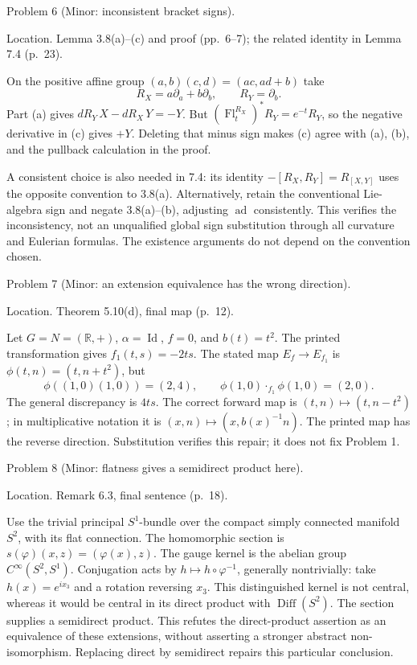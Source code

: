 \documentclass[10pt]{article}
\begin{document}
Problem 6 (Minor: inconsistent bracket signs).\par
Location. Lemma 3.8(a)–(c) and proof (pp. 6–7); the related identity in Lemma 7.4 (p. 23).\par
On the positive affine group \((a,b)(c,d)=(ac,ad+b)\) take \[R_X=a\partial_a+b\partial_b,\qquad R_Y=\partial_b.\] Part (a) gives \(dR_Y\,X-dR_X\,Y=-Y\). But \((\operatorname{Fl}_t^{R_X})^*R_Y=e^{-t}R_Y\), so the negative derivative in (c) gives \(+Y\). Deleting that minus sign makes (c) agree with (a), (b), and the pullback calculation in the proof.\par
A consistent choice is also needed in 7.4: its identity \(-[R_X,R_Y]=R_{[X,Y]}\) uses the opposite convention to 3.8(a). Alternatively, retain the conventional Lie-algebra sign and negate 3.8(a)–(b), adjusting \(\operatorname{ad}\) consistently. This verifies the inconsistency, not an unqualified global sign substitution through all curvature and Eulerian formulas. The existence arguments do not depend on the convention chosen.\par
Problem 7 (Minor: an extension equivalence has the wrong direction).\par
Location. Theorem 5.10(d), final map (p. 12).\par
Let \(G=N=(\mathbb R,+)\), \(\alpha=\operatorname{Id}\), \(f=0\), and \(b(t)=t^2\). The printed transformation gives \(f_1(t,s)=-2ts\). The stated map \(E_f\to E_{f_1}\) is \(\phi(t,n)=(t,n+t^2)\), but \[\phi((1,0)(1,0))=(2,4),\qquad
 \phi(1,0)\mathbin{\cdot_{f_1}}\phi(1,0)=(2,0).\] The general discrepancy is \(4ts\). The correct forward map is \((t,n)\mapsto(t,n-t^2)\); in multiplicative notation it is \((x,n)\mapsto(x,b(x)^{-1}n)\). The printed map has the reverse direction. Substitution verifies this repair; it does not fix Problem 1.\par
Problem 8 (Minor: flatness gives a semidirect product here).\par
Location. Remark 6.3, final sentence (p. 18).\par
Use the trivial principal \(S^1\)-bundle over the compact simply connected manifold \(S^2\), with its flat connection. The homomorphic section is \(s(\varphi)(x,z)=(\varphi(x),z)\). The gauge kernel is the abelian group \(C^\infty(S^2,S^1)\). Conjugation acts by \(h\mapsto h\circ\varphi^{-1}\), generally nontrivially: take \(h(x)=e^{ix_3}\) and a rotation reversing \(x_3\). This distinguished kernel is not central, whereas it would be central in its direct product with \(\operatorname{Diff}(S^2)\). The section supplies a semidirect product. This refutes the direct-product assertion as an equivalence of these extensions, without asserting a stronger abstract non-isomorphism. Replacing direct by semidirect repairs this particular conclusion.\par
\end{document}
